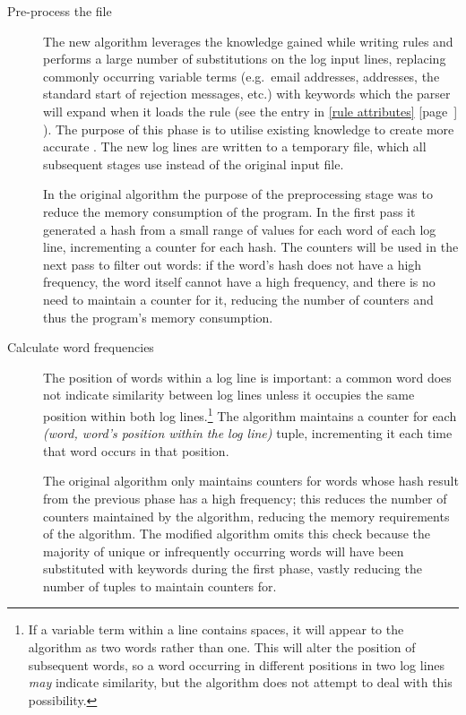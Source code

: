 \documentclass[a4paper,12pt,draft]{article}
\newcommand{\refwithpage}[1]{%
    \empty{}\ref{#1} [page~\pageref{#1}]%
}
\newcommand{\sectionref}[1]{%
    \textsection{}\refwithpage{#1}%
}
\begin{document}
\begin{description}

    \item [Pre-process the file]  The new algorithm leverages the knowledge
        gained while writing rules and performs a large number of
        substitutions on the log input lines, replacing commonly occurring
        variable terms (e.g.\ email addresses, \IP{} addresses, the
        standard start of rejection messages, etc.) with \regex{} keywords
        which the parser will expand when it loads the rule (see the
        \regex{} entry in \sectionref{rule attributes}).  The purpose of
        this phase is to utilise existing knowledge to create more accurate
        \regexes{}.  The new log lines are written to a temporary file,
        which all subsequent stages use instead of the original input file.

        In the original algorithm the purpose of the preprocessing stage
        was to reduce the memory consumption of the program.  In the first
        pass it generated a hash from a small range of values for each word
        of each log line, incrementing a counter for each hash.  The
        counters will be used in the next pass to filter out words: if the
        word's hash does not have a high frequency, the word itself cannot
        have a high frequency, and there is no need to maintain a counter
        for it, reducing the number of counters and thus the program's
        memory consumption.

    \item [Calculate word frequencies]  The position of words within a log
        line is important: a common word does not indicate similarity
        between log lines unless it occupies the same position within both
        log lines.\footnote{If a variable term within a line contains
        spaces, it will appear to the algorithm as two words rather than
        one.  This will alter the position of subsequent words, so a word
        occurring in different positions in two log lines \textit{may\/}
        indicate similarity, but the algorithm does not attempt to deal
        with this possibility.}  The algorithm maintains a counter for each
        \textit{(word, word's position within the log line)\/} tuple,
        incrementing it each time that word occurs in that position.

        The original algorithm only maintains counters for words whose hash
        result from the previous phase has a high frequency; this reduces
        the number of counters maintained by the algorithm, reducing the
        memory requirements of the algorithm.  The modified algorithm omits
        this check because the majority of unique or infrequently occurring
        words will have been substituted with keywords during the first
        phase, vastly reducing the number of tuples to maintain counters
        for.


\end{description}
\end{document}
